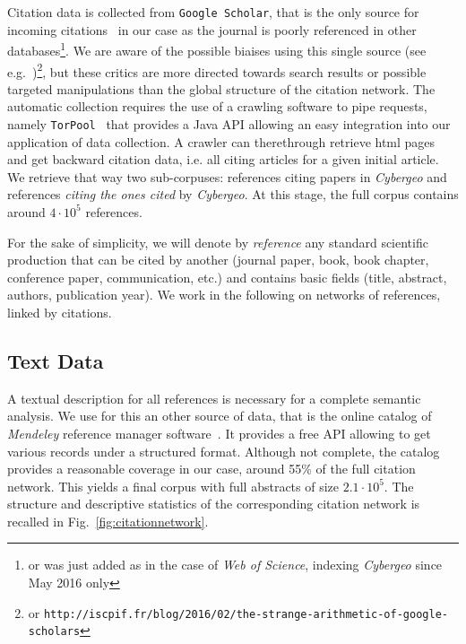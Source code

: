 \documentclass[10pt]{article}
\begin{document}
Citation data is collected from \texttt{Google Scholar}, that is the only source for incoming citations~\citep{noruzi2005google} in our case as the journal is poorly referenced in other databases\footnote{or was just added as in the case of \textit{Web of Science}, indexing \textit{Cybergeo} since May 2016 only}. We are aware of the possible biaises using this single source (see e.g.~\cite{bohannon2014scientific})\footnote{or \texttt{http://iscpif.fr/blog/2016/02/the-strange-arithmetic-of-google-scholars}}, but these critics are more directed towards search results or possible targeted manipulations than the global structure of the citation network. The automatic collection requires the use of a crawling software to pipe requests, namely \texttt{TorPool}~\citep{torpool} that provides a Java API allowing an easy integration into our application of data collection. A crawler can therethrough retrieve html pages and get backward citation data, i.e. all citing articles for a given initial article. We retrieve that way two sub-corpuses: references citing papers in \textit{Cybergeo} and references \emph{citing the ones cited} by \textit{Cybergeo}. At this stage, the full corpus contains around $4\cdot10^5$ references.


For the sake of simplicity, we will denote by \emph{reference} any standard scientific production that can be cited by another (journal paper, book, book chapter, conference paper, communication, etc.) and contains basic fields (title, abstract, authors, publication year). We work in the following on networks of references, linked by citations.



\subsection*{Text Data}

A textual description for all references is necessary for a complete semantic analysis. We use for this an other source of data, that is the online catalog of \textit{Mendeley} reference manager software~\cite{mendeley}. It provides a free API allowing to get various records under a structured format. Although not complete, the catalog provides a reasonable coverage in our case, around 55\% of the full citation network. This yields a final corpus with full abstracts of size $2.1\cdot 10^5$. The structure and descriptive statistics of the corresponding citation network is recalled in Fig.~\ref{fig:citationnetwork}.
\end{document}
